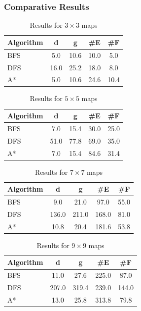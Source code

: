 \documentclass[11pt,a4paper]{article}
\begin{document}
\subsubsection{Comparative Results}

\begin{table}[H]
\centering
\caption{Results for $3\times3$ maps}
\begin{tabular}{lcccc}
\toprule
\textbf{Algorithm} & \textbf{d} & \textbf{g} & \textbf{\#E} & \textbf{\#F} \\
\midrule
BFS & 5.0 & 10.6 & 10.0 & 5.0 \\
DFS & 16.0 & 25.2 & 18.0 & 8.0 \\
A* & 5.0 & 10.6 & 24.6 & 10.4 \\
\bottomrule
\end{tabular}
\end{table}

\begin{table}[H]
\centering
\caption{Results for $5\times5$ maps}
\begin{tabular}{lcccc}
\toprule
\textbf{Algorithm} & \textbf{d} & \textbf{g} & \textbf{\#E} & \textbf{\#F} \\
\midrule
BFS & 7.0 & 15.4 & 30.0 & 25.0 \\
DFS & 51.0 & 77.8 & 69.0 & 35.0 \\
A* & 7.0 & 15.4 & 84.6 & 31.4 \\
\bottomrule
\end{tabular}
\end{table}

\begin{table}[H]
\centering
\caption{Results for $7\times7$ maps}
\begin{tabular}{lcccc}
\toprule
\textbf{Algorithm} & \textbf{d} & \textbf{g} & \textbf{\#E} & \textbf{\#F} \\
\midrule
BFS & 9.0 & 21.0 & 97.0 & 55.0 \\
DFS & 136.0 & 211.0 & 168.0 & 81.0 \\
A* & 10.8 & 20.4 & 181.6 & 53.8 \\
\bottomrule
\end{tabular}
\end{table}

\begin{table}[H]
\centering
\caption{Results for $9\times9$ maps}
\begin{tabular}{lcccc}
\toprule
\textbf{Algorithm} & \textbf{d} & \textbf{g} & \textbf{\#E} & \textbf{\#F} \\
\midrule
BFS & 11.0 & 27.6 & 225.0 & 87.0 \\
DFS & 207.0 & 319.4 & 239.0 & 144.0 \\
A* & 13.0 & 25.8 & 313.8 & 79.8 \\
\bottomrule
\end{tabular}
\end{table}
\end{document}
